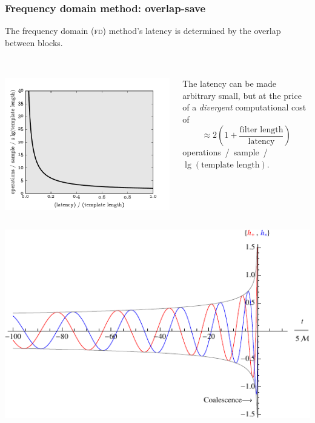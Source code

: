 \documentclass{beamer}
\begin{document}
\begin{frame}
	\frametitle{Frequency domain method: overlap-save}
	The frequency domain (\textsc{fd}) method's latency is determined by the overlap between blocks. \\~\\
	\begin{columns}
		\begin{column}{0.6\textwidth}
			\includegraphics[width=\textwidth]{figures/fd_latency}
		\end{column}
		\begin{column}{0.4\textwidth}

			The latency can be made arbitrary small, but at the price of a {\color{ink3}\emph{divergent}} computational cost of
			\begin{equation*}
				\approx 2 \left(1 + \frac{\textrm{filter length}}{\textrm{latency}}\right)
			\end{equation*}
			operations~/~sample~/ $\lg (\textrm{template length})$.
		\end{column}
	\end{columns}
\end{frame}

\begin{frame}
	\includegraphics{figures/inspiral-waveform}
\end{frame}
\end{document}
